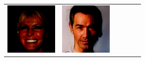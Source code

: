 \documentclass{article}
\newcommand{\pganw}{1.0in}
\begin{document}
\begin{table}[htbp]
\begin{center}
\begin{tabular}{cc|cc|cc}
\includegraphics[width=\pganw]{figures/pgan/0_base_iso_MH.png} &
\includegraphics[width=\pganw]{figures/pgan/1_base_iso_MH.png} \\

\end{tabular}
\end{center}
\end{table}
\end{document}
